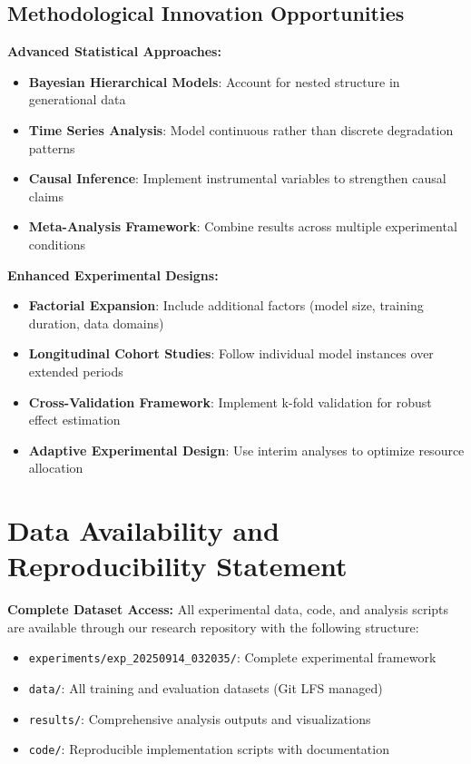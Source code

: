 \documentclass{article}
\begin{document}
\subsection{Methodological Innovation Opportunities}

\textbf{Advanced Statistical Approaches:}
\begin{itemize}
    \item \textbf{Bayesian Hierarchical Models}: Account for nested structure in generational data
    \item \textbf{Time Series Analysis}: Model continuous rather than discrete degradation patterns
    \item \textbf{Causal Inference}: Implement instrumental variables to strengthen causal claims
    \item \textbf{Meta-Analysis Framework}: Combine results across multiple experimental conditions
\end{itemize}

\textbf{Enhanced Experimental Designs:}
\begin{itemize}
    \item \textbf{Factorial Expansion}: Include additional factors (model size, training duration, data domains)
    \item \textbf{Longitudinal Cohort Studies}: Follow individual model instances over extended periods
    \item \textbf{Cross-Validation Framework}: Implement k-fold validation for robust effect estimation
    \item \textbf{Adaptive Experimental Design}: Use interim analyses to optimize resource allocation
\end{itemize}

\section{Data Availability and Reproducibility Statement}
\label{appendix:data_availability}

\textbf{Complete Dataset Access:}
All experimental data, code, and analysis scripts are available through our research repository with the following structure:
\begin{itemize}
    \item \texttt{experiments/exp\_20250914\_032035/}: Complete experimental framework
    \item \texttt{data/}: All training and evaluation datasets (Git LFS managed)
    \item \texttt{results/}: Comprehensive analysis outputs and visualizations
    \item \texttt{code/}: Reproducible implementation scripts with documentation
\end{itemize}
\end{document}
